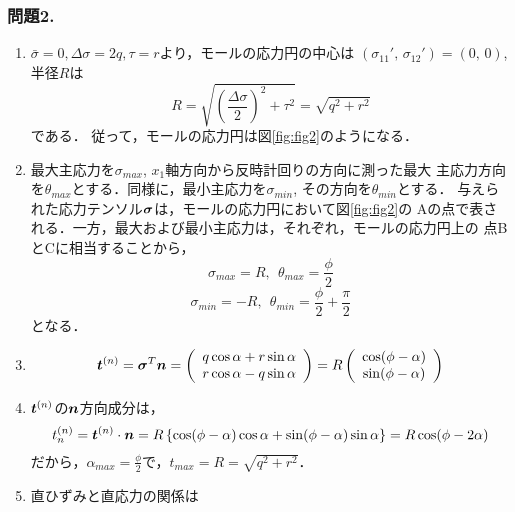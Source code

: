 \documentclass[10pt,a4j]{jarticle}
\begin{document}
\subsubsection*{問題2.}
\begin{enumerate}
\item
	$\bar{\sigma}=0, \Delta \sigma=2q, \tau = r$より，モールの応力円の中心は
	$(\sigma_{11}',\, \sigma_{12}')=(0,\, 0)$, 半径$R$は
	\begin{equation}
		R=\sqrt{\left(\frac{\Delta \sigma}{2}\right)^2+\tau ^2}=\sqrt{q^2+r^2}
		\label{neq:Radi}
	\end{equation}
	である．
	従って，モールの応力円は図\ref{fig:fig2}のようになる．
\item
	最大主応力を$\sigma_{max}$, $x_1$軸方向から反時計回りの方向に測った最大
	主応力方向を$\theta_{max}$とする．同様に，最小主応力を$\sigma_{min}$, 
	その方向を$\theta_{min}$とする．
	与えられた応力テンソル$\mbox{\boldmath $\sigma$}$は，モールの応力円において図\ref{fig:fig2}の
	Aの点で表される．一方，最大および最小主応力は，それぞれ，モールの応力円上の
	点BとCに相当することから，
	\begin{equation}
		\sigma_{max}=R, \ \ \theta_{max}=\frac{\phi}{2}
	\end{equation}
	\begin{equation}
		\sigma_{min}=-R, \ \ \theta_{min}=\frac{\phi}{2}+\frac{\pi}{2}
	\end{equation}
	となる．
\item
	\begin{equation}
		\mbox{\boldmath $t$}^{(n)}
		=\mbox{\boldmath $\sigma$}^T\mbox{\boldmath $n$}
		=
		\left( 
		\begin{array}{c}
			q\cos\alpha + r\sin\alpha \\
			r\cos\alpha - q\sin\alpha 
		\end{array}
		\right)
		=
		R
		\left( 
		\begin{array}{c}
			\cos(\phi-\alpha) \\
			\sin(\phi-\alpha) 
		\end{array}
		\right)
	\end{equation}
\item
	$\mbox{\boldmath $t$}^{(n)}$の$\mbox{\boldmath $n$}$方向成分は，
	\begin{equation}
		t^{(n)}_n=\mbox{\boldmath $t$}^{(n)}\cdot \mbox{\boldmath $n$}
		=
		R\left\{
			\cos(\phi-\alpha)\cos\alpha + \sin(\phi-\alpha) \sin\alpha
		\right\}
		=R\cos(\phi-2\alpha)
	\end{equation}
		だから，$\alpha_{max}=\frac{\phi}{2}$で，$t_{max}=R=\sqrt{q^2+r^2}$．
\item
	直ひずみと直応力の関係は

\end{enumerate}
\end{document}

